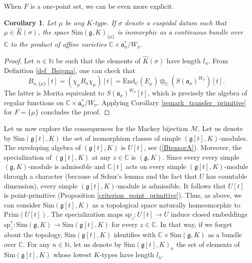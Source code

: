 \documentclass{amsart}
\newtheorem{corollary}[theorem]{Corollary}
\theoremstyle{definition}
\begin{document}
When $F$ is a one-point set, we can be even more explicit.

\begin{corollary}\label{corollary1}
    Let $\mu$ be any $K$-type. If $\sigma$ denote a cuspidal datum such that $\mu \in \widehat{K}(\sigma)$, the space $\mathrm{Sim}(\bm{\mathfrak{g}},K)_{\{\mu\}}$ is isomorphic as a continuous bundle over $\mathbb{C}$ to the product of affine varieties $\mathbb{C} \times \mathfrak{a}_\sigma^*/W_\sigma$.
\end{corollary}

\begin{proof}
    Let $n \in \mathbb{N}$ be such that the elements of $\widehat{K}(\sigma)$ have length $l_n$. From Definition \ref{def_Bsigma}, one can check that
    \[B_{n,\{\mu\}}[t] = (\chi_\mu B_\sigma \chi_\mu)[t] = \mathrm{End}_\mathbb{C}(E_\mu) \otimes_\mathbb{C} \left(S(\mathfrak{a}_\sigma)^{W_\sigma}\right)[t].\]
    The latter is Morita equivalent to $S(\mathfrak{a}_\sigma)^{W_\sigma}[t]$, which is precisely the algebra of regular functions on $\mathbb{C} \times \mathfrak{a}_\sigma^*/W_\sigma$. Applying Corollary \ref{remark_transfer_primitive} for $F = \{\mu\}$ concludes the proof.
\end{proof}

Let us now explore the consequences for the Mackey bijection $\mathcal{M}$. Let us denote by $\mathrm{Sim}(\mathfrak{g}[t],K)$ the set of isomorphism classes of simple $(\mathfrak{g}[t],K)$-modules. The enveloping algebra of $(\mathfrak{g}[t],K)$ is $U[t]$, see (\ref{BtensorA}). Moreover, the specialization of $(\mathfrak{g}[t],K)$ at any $z \in \mathbb{C}$ is $(\mathfrak{g},K)$. Since every every simple $(\mathfrak{g},K)$-module is admissible and $\mathbb{C}[t]$ acts on every simple $(\mathfrak{g}[t],K)$-module through a character (because of Schur's lemma and the fact that $U$ has countable dimension), every simple $(\mathfrak{g}[t],K)$-module is admissible. It follows that $U[t]$ is point-primitive (Proposition \ref{criterion_point_primitive}). Thus, as above, we can consider $\mathrm{Sim}(\mathfrak{g}[t],K)$ as a topological space naturally homeomorphic to $\mathrm{Prim}(U[t])$. The specialization maps $\mathrm{sp}_z : U[t] \to U$ induce closed embeddings $\mathrm{sp}^*_z : \mathrm{Sim}(\mathfrak{g},K) \to \mathrm{Sim}(\mathfrak{g}[t],K)$ for every $z \in \mathbb{C}$. In that way, if we forget about the topology, $\mathrm{Sim}(\mathfrak{g}[t],K)$ identifies with $\mathbb{C} \times \mathrm{Sim}(\mathfrak{g},K)$ as a bundle over $\mathbb{C}$. For any $n \in \mathbb{N}$, let us denote by $\mathrm{Sim}(\mathfrak{g}[t],K)_n$ the set of elements of $\mathrm{Sim}(\mathfrak{g}[t],K)$ whose lowest $K$-types have length $l_n$.
\end{document}
